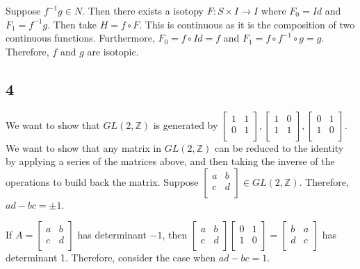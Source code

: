\documentclass{article}
\theoremstyle{definition}
\numberwithin{theorem}{section}
\numberwithin{equation}{section}
\begin{document}
Suppose $f^{-1} g \in N$. Then there exists a isotopy $F : S \times I \rightarrow I$ where $F_0 = Id$ and $F_1 = f^{-1} g$. Then take $H = f \circ F$. This is continuous as it is the composition of two continuous functions. Furthermore, $F_0 = f \circ Id = f$ and $F_1 = f \circ f^{-1} \circ g = g$. Therefore, $f$ and $g$ are isotopic.  

\subsection{4}
We want to show that $GL(2, \mathbb{Z})$ is generated by $
\begin{bmatrix}
    1 & 1\\
    0 & 1\\
\end{bmatrix},
\begin{bmatrix}
    1 & 0\\
    1 & 1\\
\end{bmatrix},
\begin{bmatrix}
    0 & 1\\
    1 & 0\\
\end{bmatrix}$. We want to show that any matrix in $GL(2, \mathbb{Z})$ can be reduced to the identity by applying a series of the matrices above, and then taking the inverse of the operations to build back the matrix. 
Suppose $\begin{bmatrix}
    a & b\\
    c & d\\
\end{bmatrix} \in GL(2, \mathbb{Z})$. Therefore, $ad - bc = \pm 1$.

If $A = \begin{bmatrix}
    a & b\\
    c & d\\
\end{bmatrix}$
has determinant $-1$, then 
$\begin{bmatrix}
    a & b\\
    c & d\\
\end{bmatrix} 
\begin{bmatrix}
    0 & 1\\
    1 & 0\\
\end{bmatrix}
=
\begin{bmatrix}
    b & a\\
    d & c\\
\end{bmatrix}
$ has determinant 1. Therefore, consider the case when $ad - bc = 1$.
\end{document}
